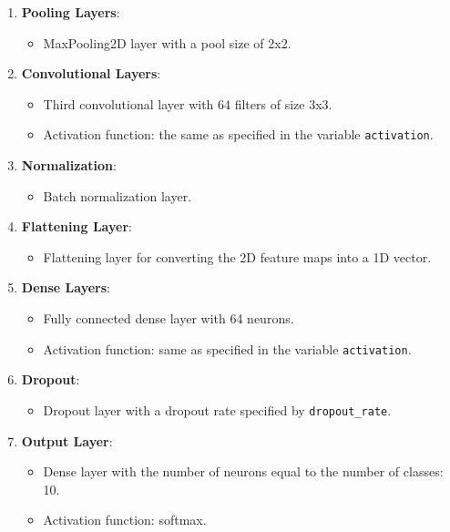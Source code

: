 \documentclass{article}
\begin{document}
\begin{enumerate}
    \item \textbf{Pooling Layers}:
          \begin{itemize}
              \item MaxPooling2D layer with a pool size of 2x2.
          \end{itemize}

    \item \textbf{Convolutional Layers}:
          \begin{itemize}
              \item Third convolutional layer with 64 filters of size 3x3.
              \item Activation function: the same as specified in the variable \texttt{activation}.
          \end{itemize}

    \item \textbf{Normalization}:
          \begin{itemize}
              \item Batch normalization layer.
          \end{itemize}

    \item \textbf{Flattening Layer}:
          \begin{itemize}
              \item Flattening layer for converting the 2D feature maps into a 1D vector.
          \end{itemize}

    \item \textbf{Dense Layers}:
          \begin{itemize}
              \item Fully connected dense layer with 64 neurons.
              \item Activation function: same as specified in the variable \texttt{activation}.
          \end{itemize}

    \item \textbf{Dropout}:
          \begin{itemize}
              \item Dropout layer with a dropout rate specified by \texttt{dropout\_rate}.
          \end{itemize}

    \item \textbf{Output Layer}:
          \begin{itemize}
              \item Dense layer with the number of neurons equal to the number of classes: 10.
              \item Activation function: softmax.
          \end{itemize}
\end{enumerate}
\end{document}
